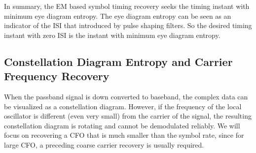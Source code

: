 \documentclass[journal,comsoc, onecolumn, 12pt,draftclsnofoot]{IEEEtran} %
\begin{document}
In summary, the EM based symbol timing recovery seeks the timing instant with minimum eye diagram entropy. 
The eye diagram entropy can be seen as an indicator of the ISI that introduced by pulse shaping filters.
So the  desired timing instant with zero ISI is the instant with minimum eye diagram entropy. 


\subsection{Constellation Diagram Entropy and Carrier Frequency Recovery}
\label{sec:const_entp}
When the passband signal is down converted to baseband, the complex data can be visualized as a constellation diagram.
However, if the frequency of the local oscillator is  different (even very small) from the carrier of the signal, the resulting constellation diagram is rotating and cannot be demodulated reliably.
We will focus on recovering a CFO that is much smaller than the symbol rate, since for large CFO, a preceding coarse carrier recovery is usually required.
\end{document}
